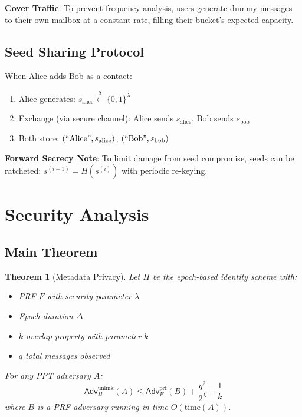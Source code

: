 \documentclass[11pt]{article}
\newtheorem{theorem}{Theorem}[section]
\newcommand{\Adv}{\mathsf{Adv}}
\begin{document}
\textbf{Cover Traffic}: To prevent frequency analysis, users generate dummy messages
to their own mailbox at a constant rate, filling their bucket's expected capacity.

\subsection{Seed Sharing Protocol}

When Alice adds Bob as a contact:
\begin{enumerate}
    \item Alice generates: $s_{\text{alice}} \stackrel{\$}{\gets} \{0,1\}^{\lambda}$
    \item Exchange (via secure channel): Alice sends $s_{\text{alice}}$, Bob sends $s_{\text{bob}}$
    \item Both store: $(``\text{Alice}", s_{\text{alice}})$, $(``\text{Bob}", s_{\text{bob}})$
\end{enumerate}

\textbf{Forward Secrecy Note}: To limit damage from seed compromise, seeds can be
ratcheted: $s^{(i+1)} = H(s^{(i)})$ with periodic re-keying.

\section{Security Analysis}

\subsection{Main Theorem}

\begin{theorem}[Metadata Privacy]
\label{thm:main}
Let $\Pi$ be the epoch-based identity scheme with:
\begin{itemize}
    \item PRF $F$ with security parameter $\lambda$
    \item Epoch duration $\Delta$
    \item $k$-overlap property with parameter $k$
    \item $q$ total messages observed
\end{itemize}

For any PPT adversary $A$:
\[
\Adv^{\text{unlink}}_{\Pi}(A) \leq \Adv^{\text{prf}}_{F}(B) + \frac{q^2}{2^{\lambda}} + \frac{1}{k}
\]
where $B$ is a PRF adversary running in time $O(\text{time}(A))$.
\end{theorem}
\end{document}
